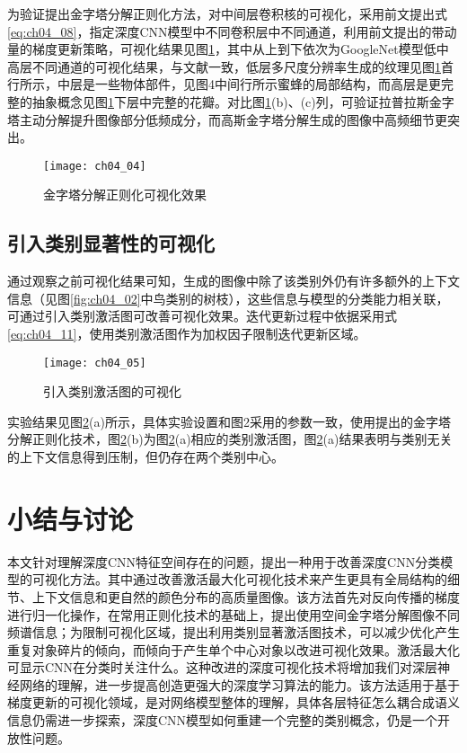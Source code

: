 为验证提出金字塔分解正则化方法，对中间层卷积核的可视化，采用前文提出式\ref{eq:ch04_08}，指定深度CNN模型中不同卷积层中不同通道，利用前文提出的带动量的梯度更新策略，可视化结果见图\ref{fig:ch04_04}，其中从上到下依次为GoogleNet模型低中高层不同通道的可视化结果，与文献\citep{Zeiler2014}一致，低层多尺度分辨率生成的纹理见图\ref{fig:ch04_04}首行所示，中层是一些物体部件，见图4中间行所示蜜蜂的局部结构，而高层是更完整的抽象概念见图\ref{fig:ch04_04}下层中完整的花瓣。对比图\ref{fig:ch04_04}(b)、(c)列，可验证拉普拉斯金字塔主动分解提升图像部分低频成分，而高斯金字塔分解生成的图像中高频细节更突出。
\begin{figure}[!htbp]
\centering
\texttt{[image: ch04\_04]}
\caption{金字塔分解正则化可视化效果}
\label{fig:ch04_04}
\end{figure} 

\subsection{引入类别显著性的可视化} 

通过观察之前可视化结果可知，生成的图像中除了该类别外仍有许多额外的上下文信息（见图\ref{fig:ch04_02}中鸟类别的树枝），这些信息与模型的分类能力相关联，可通过引入类别激活图可改善可视化效果。迭代更新过程中依据采用式\ref{eq:ch04_11}，使用类别激活图作为加权因子限制迭代更新区域。
\begin{figure}[!htbp]
\centering
\texttt{[image: ch04\_05]}
\caption{引入类别激活图的可视化}
\label{fig:ch04_05}
\end{figure}  

实验结果见图\ref{fig:ch04_05}(a)所示，具体实验设置和图2采用的参数一致，使用提出的金字塔分解正则化技术，图\ref{fig:ch04_05}(b)为图\ref{fig:ch04_05}(a)相应的类别激活图，图\ref{fig:ch04_05}(a)结果表明与类别无关的上下文信息得到压制，但仍存在两个类别中心。

\section{小结与讨论}

本文针对理解深度CNN特征空间存在的问题，提出一种用于改善深度CNN分类模型的可视化方法。其中通过改善激活最大化可视化技术来产生更具有全局结构的细节、上下文信息和更自然的颜色分布的高质量图像。该方法首先对反向传播的梯度进行归一化操作，在常用正则化技术的基础上，提出使用空间金字塔分解图像不同频谱信息；为限制可视化区域，提出利用类别显著激活图技术，可以减少优化产生重复对象碎片的倾向，而倾向于产生单个中心对象以改进可视化效果。激活最大化可显示CNN在分类时关注什么。这种改进的深度可视化技术将增加我们对深层神经网络的理解，进一步提高创造更强大的深度学习算法的能力。该方法适用于基于梯度更新的可视化领域，是对网络模型整体的理解，具体各层特征怎么耦合成语义信息仍需进一步探索，深度CNN模型如何重建一个完整的类别概念，仍是一个开放性问题。
